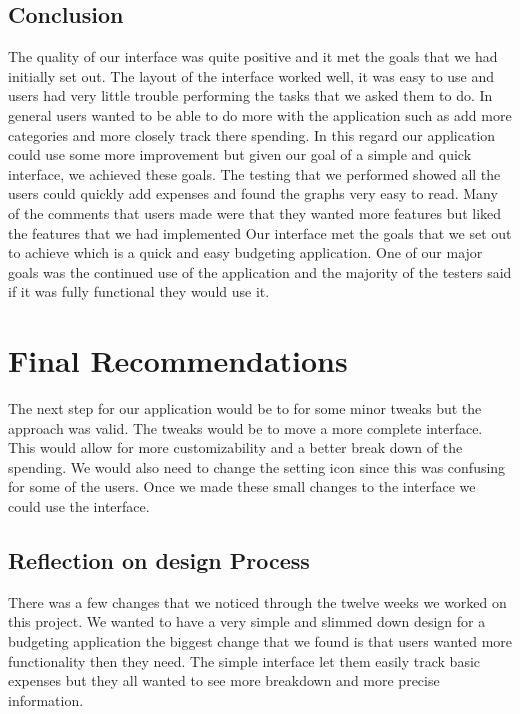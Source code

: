 \documentclass{chi2011}
\begin{document}
	\subsection{Conclusion}
	The quality of our interface was quite positive and it met the goals that we
	had initially set out. The layout of the interface worked well, it was easy
	to use and users had very little trouble performing the tasks that we asked
	them to do. In general users wanted to be able to do more with the
	application such as add more categories and more closely track there
	spending. In this regard our application could use some more improvement but
	given our goal of a simple and quick interface, we achieved these goals. The
	testing that we performed showed all the users could quickly add expenses
	and found the graphs very easy to read. Many of the comments that users made
	were that they wanted more features but liked the features that we had
	implemented Our interface met the goals that we set out to achieve which is
	a quick and easy budgeting application. One of our major goals was the
	continued use of the application and the majority of the testers said if it
	was fully functional they would use it.


\section{Final Recommendations}
	
The next step for our application would be to for some minor tweaks but the
approach was valid. The tweaks would be to move a more complete interface. This
would allow for more customizability and a better break down of the spending. We
would also need to change the setting icon since this was confusing for some of
the users. Once we made these small changes to the interface we could use the
interface. 

\subsection{Reflection on design Process}

There was a few changes that we noticed through the twelve weeks we worked on
this project. We wanted to have a very simple and slimmed down design for a
budgeting application the biggest change that we found is that users wanted more
functionality then they need. The simple interface let them easily track basic
expenses but they all wanted to see more breakdown and more precise information.
\end{document}
